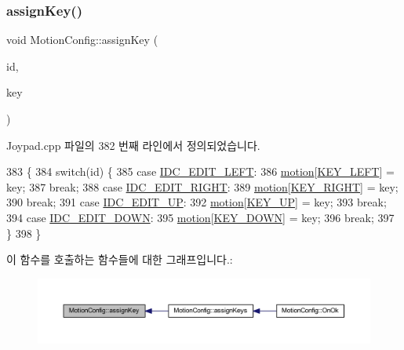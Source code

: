 \subsubsection{\texorpdfstring{assign\+Key()}{assignKey()}}
{\footnotesize\ttfamily void Motion\+Config\+::assign\+Key (\begin{DoxyParamCaption}\item[{\mbox{\hyperlink{_util_8cpp_a0ef32aa8672df19503a49fab2d0c8071}{int}}}]{id,  }\item[{L\+O\+N\+G\+\_\+\+P\+TR}]{key }\end{DoxyParamCaption})}



Joypad.\+cpp 파일의 382 번째 라인에서 정의되었습니다.


\begin{DoxyCode}
383 \{
384   \textcolor{keywordflow}{switch}(\textcolor{keywordtype}{id}) \{
385   \textcolor{keywordflow}{case} \mbox{\hyperlink{resource_8h_ae8bd1d3525011019fb5ff9406e0d2404}{IDC\_EDIT\_LEFT}}:
386     \mbox{\hyperlink{_joypad_8cpp_af6761499604a971a202b9ea0dc6ef5a9}{motion}}[\mbox{\hyperlink{_s_d_l_8cpp_abc5c98fcc1211af2b80116dd6e0a035da612120b69c7dfd46086db7aaebdbcf65}{KEY\_LEFT}}] = key;
387     \textcolor{keywordflow}{break};
388   \textcolor{keywordflow}{case} \mbox{\hyperlink{resource_8h_ae29438ab510968afa9068e0c6b80ed57}{IDC\_EDIT\_RIGHT}}:
389     \mbox{\hyperlink{_joypad_8cpp_af6761499604a971a202b9ea0dc6ef5a9}{motion}}[\mbox{\hyperlink{_s_d_l_8cpp_abc5c98fcc1211af2b80116dd6e0a035da6504370d9c6391e1a9da6a1a529b089d}{KEY\_RIGHT}}] = key;
390     \textcolor{keywordflow}{break};
391   \textcolor{keywordflow}{case} \mbox{\hyperlink{resource_8h_ae0645e746a25d4d061e3fae80babcc78}{IDC\_EDIT\_UP}}:
392     \mbox{\hyperlink{_joypad_8cpp_af6761499604a971a202b9ea0dc6ef5a9}{motion}}[\mbox{\hyperlink{_s_d_l_8cpp_abc5c98fcc1211af2b80116dd6e0a035da0848a442d907968b211b97bc2bd88acd}{KEY\_UP}}] = key;
393     \textcolor{keywordflow}{break};
394   \textcolor{keywordflow}{case} \mbox{\hyperlink{resource_8h_a3c298d6303318c2193f262cfae3e413c}{IDC\_EDIT\_DOWN}}:
395     \mbox{\hyperlink{_joypad_8cpp_af6761499604a971a202b9ea0dc6ef5a9}{motion}}[\mbox{\hyperlink{_s_d_l_8cpp_abc5c98fcc1211af2b80116dd6e0a035daa9cdac7967bf7d88fdb761138a2a3416}{KEY\_DOWN}}] = key;
396     \textcolor{keywordflow}{break};
397   \}
398 \}
\end{DoxyCode}
이 함수를 호출하는 함수들에 대한 그래프입니다.\+:
\nopagebreak
\begin{figure}[H]
\begin{center}
\leavevmode
\includegraphics[width=350pt]{class_motion_config_a50d94176c92cf39ca894892a0b3bf2ef_icgraph}
\end{center}
\end{figure}
\mbox{\label{class_motion_config_a73d6bc239e8abd59b68f23ddaaf6daf4}} 
